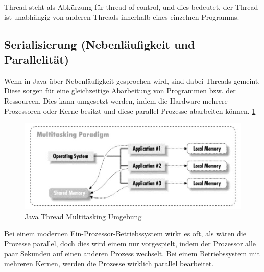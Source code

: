  
Thread steht als Abkürzung für thread of control, und dies bedeutet, der Thread ist unabhängig von anderen Threads innerhalb eines einzelnen Programms.  \cite{JavaThreadsBuch}
 
 
\subsection{Serialisierung (Nebenläufigkeit und Parallelität)}
Wenn in Java über Nebenläufigkeit gesprochen wird, sind dabei Threads gemeint. Diese sorgen für eine gleichzeitige Abarbeitung von Programmen bzw. der Ressourcen. Dies kann umgesetzt werden, indem die Hardware mehrere Prozessoren oder Kerne besitzt und diese parallel Prozesse abarbeiten können. \ref{fig:impl:javaThreadMultitasking}

\begin{figure}[h t]
    \centering
    \includegraphics[scale=1]{pics/javaThreadMultitasking.jpg}
    \caption{Java Thread Multitasking Umgebung \cite{JavaThreadsBuch}}
    \label{fig:impl:javaThreadMultitasking}
\end{figure}

Bei einem modernen Ein-Prozessor-Betriebssystem wirkt es oft, als wären die Prozesse parallel, doch dies wird einem nur vorgespielt, indem der Prozessor alle paar Sekunden auf einen anderen Prozess wechselt. Bei einem Betriebssystem mit mehreren Kernen, werden die Prozesse wirklich parallel bearbeitet. \cite{javaInselBuch}

